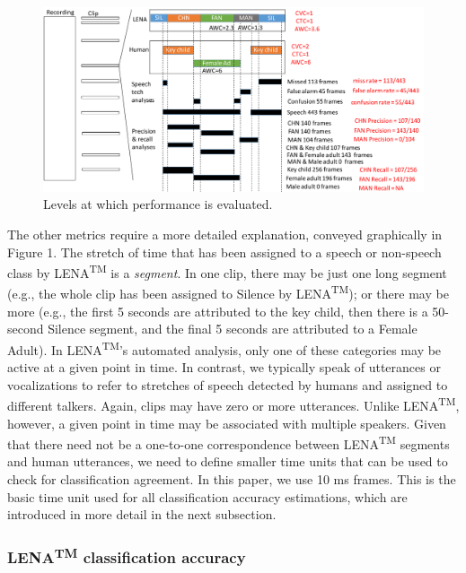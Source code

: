 \documentclass[english,floatsintext,man]{apa6}
\begin{document}
\begin{figure}
\centering
\includegraphics{fig_levels.pdf}
\caption{Levels at which performance is evaluated.}
\end{figure}

The other metrics require a more detailed explanation, conveyed
graphically in Figure 1. The stretch of time that has been assigned to a
speech or non-speech class by LENA\textsuperscript{TM} is a
\emph{segment}. In one clip, there may be just one long segment (e.g.,
the whole clip has been assigned to Silence by
LENA\textsuperscript{TM}); or there may be more (e.g., the first 5
seconds are attributed to the key child, then there is a 50-second
Silence segment, and the final 5 seconds are attributed to a Female
Adult). In LENA\textsuperscript{TM}'s automated analysis, only one of
these categories may be active at a given point in time. In contrast, we
typically speak of utterances or vocalizations to refer to stretches of
speech detected by humans and assigned to different talkers. Again,
clips may have zero or more utterances. Unlike LENA\textsuperscript{TM},
however, a given point in time may be associated with multiple speakers.
Given that there need not be a one-to-one correspondence between
LENA\textsuperscript{TM} segments and human utterances, we need to
define smaller time units that can be used to check for classification
agreement. In this paper, we use 10 ms frames. This is the basic time
unit used for all classification accuracy estimations, which are
introduced in more detail in the next subsection.

\subsubsection{\texorpdfstring{LENA\textsuperscript{TM} classification
accuracy}{LENATM classification accuracy}}\label{lenatm-classification-accuracy}
\end{document}
